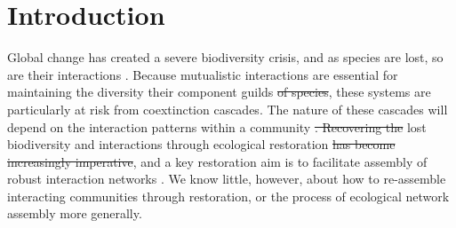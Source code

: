 \documentclass[12pt]{article}
\newcommand{\flagged}[1] {
  \textcolor{blue}{#1}
}
\providecommand{\DIFaddtex}[1]{{\protect\color{blue}\uwave{#1}}} %
\providecommand{\DIFdeltex}[1]{{\protect\color{red}\sout{#1}}}                      %
\providecommand{\DIFaddbegin}{} %
\providecommand{\DIFaddend}{} %
\providecommand{\DIFdelbegin}{} %
\providecommand{\DIFdelend}{} %
\providecommand{\DIFadd}[1]{\texorpdfstring{\DIFaddtex{#1}}{#1}} %
\providecommand{\DIFdel}[1]{\texorpdfstring{\DIFdeltex{#1}}{}} %
\begin{document}
\section*{Introduction}
\label{sec:introduction}

Global change has created a severe biodiversity crisis, and as species
are lost, so are their interactions \citep{dunn2009sixth,
  barnosky2011has}. Because mutualistic interactions are essential for
maintaining the diversity their component guilds \DIFdelbegin \DIFdel{of species}\DIFdelend \DIFaddbegin \DIFadd{\flagged{also perhaps can mention here interdependence of mutualists}}\DIFaddend , these
systems are particularly at risk from coextinction cascades. The
nature of these cascades will depend on the interaction patterns
within a community \citep{Memmott2004, Rezende2007,
  Bascompte2009} \DIFdelbegin \DIFdel{. Recovering the }\DIFdelend \DIFaddbegin \DIFadd{\flagged{maybe cite Thebault and Fontaine 2014}. \flagged{To safeguard function it has become increasingly imperative to..} aid the recovery of }\DIFaddend lost biodiversity and interactions
through ecological restoration \DIFdelbegin \DIFdel{has become increasingly imperative}\DIFdelend \DIFaddbegin \DIFadd{\flagged{remove this: has become increasingly imperative. Marilia: I like this sentence}}\DIFaddend , and
a key restoration aim is to facilitate assembly of robust interaction
networks \citep{menz-2010-4}. We know little, however, about how to
re-assemble interacting communities through restoration, or the
process of ecological network assembly more generally.
\end{document}
